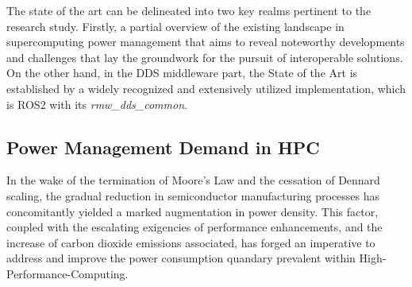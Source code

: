 

The state of the art can be delineated into two key realms pertinent to the research study. Firstly, a partial overview of the existing landscape in supercomputing power management that aims to reveal noteworthy developments and challenges that lay the groundwork for the pursuit of interoperable solutions. On the other hand, in the DDS middleware part, the State of the Art is established by a widely recognized and extensively utilized implementation, which is ROS2 with its \emph{rmw\_dds\_common}.%

\subsection{Power Management Demand in HPC}
In the wake of the termination of Moore's Law and the cessation of Dennard scaling, the gradual reduction in semiconductor manufacturing processes has concomitantly yielded a marked augmentation in power density\cite{MOSFET-Scaling}. This factor, coupled with the escalating exigencies of performance enhancements, and the increase of carbon dioxide emissions associated, has forged an imperative to address and improve the power consumption quandary prevalent within High-Performance-Computing.


